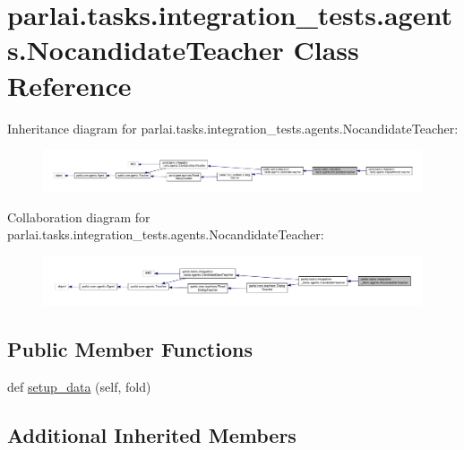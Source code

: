 \hypertarget{classparlai_1_1tasks_1_1integration__tests_1_1agents_1_1NocandidateTeacher}{}\section{parlai.\+tasks.\+integration\+\_\+tests.\+agents.\+Nocandidate\+Teacher Class Reference}
\label{classparlai_1_1tasks_1_1integration__tests_1_1agents_1_1NocandidateTeacher}


Inheritance diagram for parlai.\+tasks.\+integration\+\_\+tests.\+agents.\+Nocandidate\+Teacher\+:\nopagebreak
\begin{figure}[H]
\begin{center}
\leavevmode
\includegraphics[width=350pt]{d9/d5c/classparlai_1_1tasks_1_1integration__tests_1_1agents_1_1NocandidateTeacher__inherit__graph}
\end{center}
\end{figure}


Collaboration diagram for parlai.\+tasks.\+integration\+\_\+tests.\+agents.\+Nocandidate\+Teacher\+:\nopagebreak
\begin{figure}[H]
\begin{center}
\leavevmode
\includegraphics[width=350pt]{d0/d48/classparlai_1_1tasks_1_1integration__tests_1_1agents_1_1NocandidateTeacher__coll__graph}
\end{center}
\end{figure}
\subsection*{Public Member Functions}
\begin{DoxyCompactItemize}
\item 
def \hyperlink{classparlai_1_1tasks_1_1integration__tests_1_1agents_1_1NocandidateTeacher_a0cf2accf985db966f44f77a7328fcff2}{setup\+\_\+data} (self, fold)
\end{DoxyCompactItemize}
\subsection*{Additional Inherited Members}



